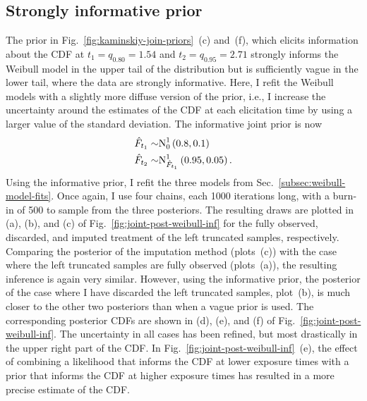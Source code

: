 \subsection{Strongly informative prior} \label{subsec:weibull-model-fits-informative}

The prior in Fig.~\ref{fig:kaminskiy-join-priors}~(c) and~(f), which elicits information about the CDF at $t_1 = q_{0.80} = 1.54$ and $t_2 = q_{0.95} = 2.71$ strongly informs the Weibull model in the upper tail of the distribution but is sufficiently vague in the lower tail, where the data are strongly informative. Here, I refit the Weibull models with a slightly more diffuse version of the prior, i.e., I increase the uncertainty around the estimates of the CDF at each elicitation time by using a larger value of the standard deviation. The informative joint prior is now
\begin{align*}
    \hat{F}_{t_1} \sim & \hbox{N}^{1}_{0}\left(0.8, 0.1\right)    \\
    \hat{F}_{t_2} \sim & \hbox{N}^{1}_{\hat{F}_{t_1}}\left(0.95, 0.05\right).
\end{align*}
Using the informative prior, I refit the three models from Sec.~\ref{subsec:weibull-model-fits}. Once again, I use four chains, each 1000 iterations long, with a burn-in of 500 to sample from the three posteriors. The resulting draws are plotted in (a), (b), and (c) of Fig.~\ref{fig:joint-post-weibull-inf} for the fully observed, discarded, and imputed treatment of the left truncated samples, respectively. Comparing the posterior of the imputation method (plots~(c)) with the case where the left truncated samples are fully observed (plots~(a)), the resulting inference is again very similar. However, using the informative prior, the posterior of the case where I have discarded the left truncated samples, plot~(b), is much closer to the other two posteriors than when a vague prior is used. The corresponding posterior CDFs are shown in (d), (e), and (f) of Fig.~\ref{fig:joint-post-weibull-inf}. The uncertainty in all cases has been refined, but most drastically in the upper right part of the CDF. In Fig.~\ref{fig:joint-post-weibull-inf}~(e), the effect of combining a likelihood that informs the CDF at lower exposure times with a prior that informs the CDF at higher exposure times has resulted in a more precise estimate of the CDF. 

